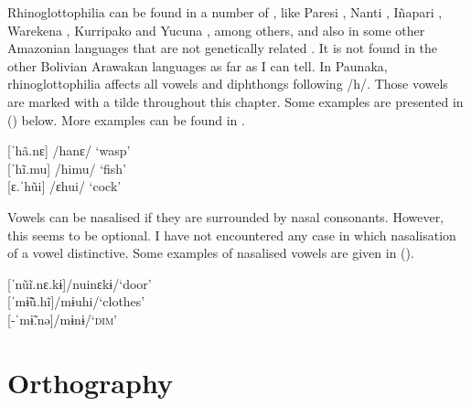 Rhinoglottophilia can be found in a number of , like Paresi \citep[cf.][85]{daSilva2009}, Nanti \citep[cf.][231]{Michael2008}, Iñapari \citep[cf.][9]{Parker1999}, Warekena \citep[cf.][401]{Aikhenvald1998}, Kurripako \citep[cf.][75]{Granadillo2006} and Yucuna \citep[cf.][8]{SchauerSchauer1978}, among others, and also in some other Amazonian languages that are not genetically related \citep[cf.][116]{Aikhenvald2012}. It is not found in the other Bolivian Arawakan languages as far as I can tell. %
In Paunaka, rhinoglottophilia affects all vowels and diphthongs following /h/. Those vowels are marked with a tilde throughout this chapter. Some examples are presented in () below. More examples can be found in .


\ea\label{ex:Rhinoglottophilia}
       [ˈhã.nɛ] \tab /hanɛ/ \tab ‘wasp’\\
       {[}ˈhĩ.mu] \tab /himu/ \tab ‘fish’\\
	{[}ɛ.ˈhũi] \tab /ɛhui/ \tab ‘cock’\\%
	\xe
{}
	
Vowels can be nasalised if they are surrounded by nasal consonants. However, this seems to be optional. I have not encountered any case in which nasalisation of a vowel distinctive. Some examples of nasalised vowels are given in ().

\ea\label{ex:NasalVs}
       [ˈnũĩ.nɛ.kɨ]\tab /nuinɛkɨ/\tab ‘door’\\
       {[}ˈmɨ̃ũ.hĩ]\tab /mɨuhi/\tab ‘clothes’\\
       {[}-ˈmɨ̃.nə]\tab /mɨnɨ/\tab\tab ‘\textsc{dim}’\\%
	\xe
{}	

\section{Orthography} \label{sec:Orthography}

